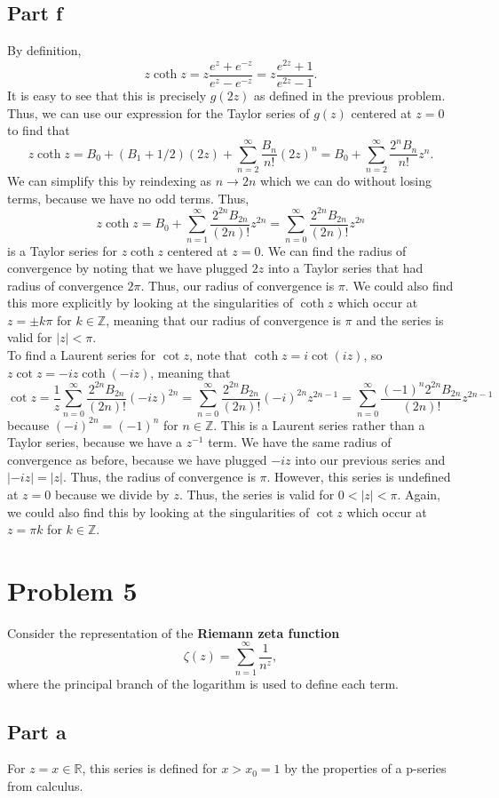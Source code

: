 \documentclass{article}
\begin{document}
\subsection{Part f}
By definition, 
\[
z\coth{z}=z\frac{e^z+e^{-z}}{e^z-e^{-z}}=z\frac{e^{2z}+1}{e^{2z}-1}.
\]
It is easy to see that this is precisely $g(2z)$ as defined in the previous problem. Thus, we can use our expression for the Taylor series of $g(z)$ centered at $z=0$ to find that
\[
z\coth{z}=B_0+(B_1+1/2)(2z)+\sum_{n=2}^\infty \frac{B_n}{n!}(2z)^n=B_0+\sum_{n=2}^\infty \frac{2^nB_n}{n!}z^n.
\]
We can simplify this by reindexing as $n\to2n$ which we can do without losing terms, because we have no odd terms. Thus, 
\[
z\coth{z}=B_0+\sum_{n=1}^\infty \frac{2^{2n}B_{2n}}{(2n)!}z^{2n}=\sum_{n=0}^\infty \frac{2^{2n}B_{2n}}{(2n)!}z^{2n}
\]
is a Taylor series for $z\coth{z}$ centered at $z=0$. We can find the radius of convergence by noting that we have plugged $2z$ into a Taylor series that had radius of convergence $2\pi$. Thus, our radius of convergence is $\pi$. We could also find this more explicitly by looking at the singularities of $\coth{z}$ which occur at $z=\pm k\pi$ for $k\in\mathbb{Z}$, meaning that our radius of convergence is $\pi$ and the series is valid for $|z|<\pi$.\\
To find a Laurent series for $\cot{z}$, note that $\coth{z}=i\cot(iz)$, so $z\cot z=-iz\coth(-iz)$, meaning that 
\[
\cot z=\frac{1}{z}\sum_{n=0}^\infty \frac{2^{2n}B_{2n}}{(2n)!}(-iz)^{2n}=\sum_{n=0}^\infty \frac{2^{2n}B_{2n}}{(2n)!}(-i)^{2n}z^{2n-1}=\sum_{n=0}^\infty \frac{(-1)^n2^{2n}B_{2n}}{(2n)!}z^{2n-1}
\]
because $(-i)^{2n}=(-1)^n$ for $n\in\mathbb{Z}$. This is a Laurent series rather than a Taylor series, because we have a $z^{-1}$ term. We have the same radius of convergence as before, because we have plugged $-iz$ into our previous series and $|-iz|=|z|$. Thus, the radius of convergence is $\pi$. However, this series is undefined at $z=0$ because we divide by $z$. Thus, the series is valid for $0<|z|<\pi$. Again, we could also find this by looking at the singularities of $\cot z$ which occur at $z=\pi k$ for $k\in\mathbb{Z}$. 

\section{Problem 5}
Consider the representation of the {\bf Riemann zeta function}
	\[
	\zeta(z)=\sum_{n=1}^\infty \frac{1}{n^z},
	\]
	where the principal branch of the logarithm is used to define each
	term.
\subsection{Part a}
For $z=x\in\mathbb{R}$, this series is defined for $x>x_0=1$ by the properties of a p-series from calculus.
\end{document}
